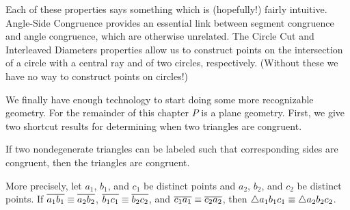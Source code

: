 \begin{dfn}
\begin{proplist}
\begin{center}
\end{center}
\end{proplist}
\end{dfn}

Each of these properties says something which is (hopefully!) fairly intuitive.
Angle-Side Congruence provides an essential link between segment congruence and angle congruence, which are otherwise unrelated.
The Circle Cut and Interleaved Diameters properties allow us to construct points on the intersection of a circle with a central ray and of two circles, respectively.
(Without these we have no way to construct points on circles!)

We finally have enough technology to start doing some more recognizable geometry.
For the remainder of this chapter \(P\) is a plane geometry.
First, we give two shortcut results for determining when two triangles are congruent.

\begin{prop}\label{prop:sss-theorem}
If two nondegenerate triangles can be labeled such that corresponding sides are congruent, then the triangles are congruent.

More precisely, let \(a_1\), \(b_1\), and \(c_1\) be distinct points and \(a_2\), \(b_2\), and \(c_2\) be distinct points.
If \(\overline{a_1b_1} \equiv \overline{a_2b_2}\), \(\overline{b_1c_1} \equiv \overline{b_2c_2}\), and \(\overline{c_1a_1} \equiv \overline{c_2a_2}\), then \(\bigtriangleup{a_1b_1c_1} \equiv \bigtriangleup{a_2b_2c_2}\).
\end{prop}


